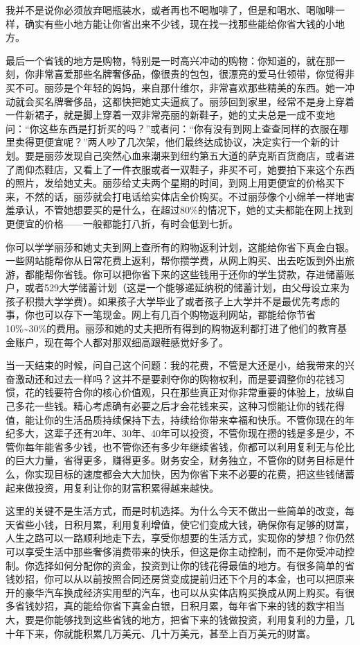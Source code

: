 我并不是说你必须放弃喝瓶装水，或者再也不喝咖啡了，但是和喝水、喝咖啡一样，确实有些小地方能让你省出来不少钱，现在找一找那些能给你省大钱的小地方。

最后一个省钱的地方是购物，特别是一时高兴冲动的购物：你知道的，就在那一刻，你非常喜爱那些名牌奢侈品，像很贵的包包，很漂亮的爱马仕领带，你觉得非买不可。丽莎是个年轻的妈妈，来自那什维尔，非常喜欢那些精美的东西。她一冲动就会买名牌奢侈品，这都快把她丈夫逼疯了。丽莎回到家里，经常不是身上穿着一件新裙子，就是脚上穿着一双非常亮丽的新鞋子，她的丈夫总是一成不变地问：“你这些东西是打折买的吗？”或者问：“你有没有到网上查查同样的衣服在哪里卖得更便宜呢？”两人吵了几次架，他们最终达成协议，决定实行一个新的计划。要是丽莎发现自己突然心血来潮来到纽约第五大道的萨克斯百货商店，或者进了周仰杰鞋店，又看上了一件衣服或者一双鞋子，非买不可，她要拍下来这个东西的照片，发给她丈夫。丽莎给丈夫两个星期的时间，到网上用更便宜的价格买下来，不然的话，丽莎就会打电话给实体店全价购买。不过丽莎像个小绵羊一样地害羞承认，不管她想要买的是什么，在超过80\%的情况下，她的丈夫都能在网上找到更便宜的价格——一般都能打八折，有时会低到七折。

你可以学学丽莎和她丈夫到网上查所有的购物返利计划，这能给你省下真金白银。一些网站能帮你从日常花费上返利，帮你攒学费，从网上购买、出去吃饭到外出旅游，都能帮你省钱。你可以把你省下来的这些钱用于还你的学生贷款，存进储蓄账户，或者529大学储蓄计划（这是一个能够递延纳税的储蓄计划，由父母设立来为孩子积攒大学学费）。如果孩子大学毕业了或者孩子上大学并不是最优先考虑的事，你也可以存下一笔现金。网上有几百个购物返利网站，都能给你节省10\%\textasciitilde{}30\%的费用。丽莎和她的丈夫把所有得到的购物返利都打进了他们的教育基金账户，现在每个人都对那双细高跟鞋感觉好多了。

当一天结束的时候，问自己这个问题：我的花费，不管是大还是小，给我带来的兴奋激动还和过去一样吗？这并不是要剥夺你的购物权利，而是要调整你的花钱习惯，花的钱要符合你的核心价值观，只在那些真正对你非常重要的体验上，放纵自己多花一些钱。精心考虑确有必要之后才会花钱来买，这种习惯能让你的钱花得值，能让你的生活品质持续保持下去，持续给你带来幸福和快乐。不管你现在的年纪多大，这辈子还有20年、30年、40年可以投资，不管你现在攒的钱是多是少，不管你每年能省多少钱，也不管你还有多少年继续省钱，你都可以利用复利无与伦比的巨大力量，省得更多，赚得更多。财务安全，财务独立，不管你的财务目标是什么，你实现目标的速度都会大大加快，因为你省下来不必要的花费，把这些钱储蓄起来做投资，用复利让你的财富积累得越来越快。

这里的关键不是生活方式，而是时机选择。为什么今天不做出一些简单的改变，每天省些小钱，日积月累，利用复利增值，使它们变成大钱，确保你有足够的财富，人生之路可以一路顺利地走下去，享受你想要的生活方式，实现你的梦想？你仍然可以享受生活中那些奢侈消费带来的快乐，但这是你主动控制，而不是你受冲动控制。你选择如何分配你的资金，投资到让你的钱花得最值的地方。有很多简单的省钱妙招，你可以从以前按照合同还房贷变成提前归还下个月的本金，也可以把原来开的豪华汽车换成经济实用型的汽车，也可以从实体店购买换成从网上购买。有很多省钱妙招，真的能给你省下真金白银，日积月累，每年省下来的钱的数字相当大，要是你能够找到这些省钱的地方，把省下来的钱做投资，利用复利的力量，几十年下来，你就能积累几万美元、几十万美元，甚至上百万美元的财富。

